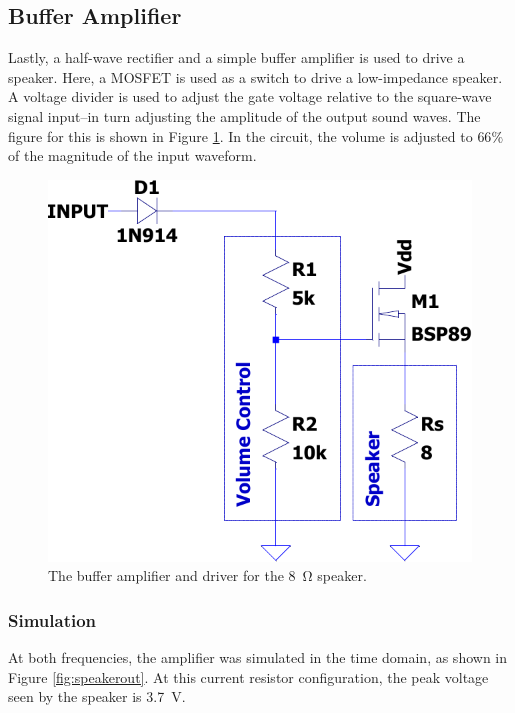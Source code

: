 \documentclass[11pt,letter,notitlepage]{article}
\begin{document}
	\subsection{Buffer Amplifier}
	Lastly, a half-wave rectifier and a simple buffer amplifier is used to drive a speaker. Here, a MOSFET is used as a switch to drive a low-impedance speaker. A voltage divider is used to adjust the gate voltage relative to the square-wave signal input--in turn adjusting the amplitude of the output sound waves. The figure for this is shown in Figure \ref{fig:speakerckt-crop}. In the circuit, the volume is adjusted to $66\%$ of the magnitude of the input waveform.
	
	\begin{figure}[h]
		\centering
		\includegraphics[width=0.5\linewidth]{speaker/speakerckt-crop}
		\caption{The buffer amplifier and driver for the \SI{8}{\ohm} speaker.}
		\label{fig:speakerckt-crop}
	\end{figure}
	
	
	\subsubsection{Simulation}
	At both frequencies, the amplifier was simulated in the time domain, as shown in Figure \ref{fig:speakerout}. At this current resistor configuration, the peak voltage seen by the speaker is \SI{3.7}{\V}.
	
\end{document}
